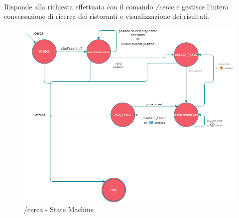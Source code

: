 \documentclass[a4paper, 12pt]{article}
\begin{document}
	\paragraph{}
	Risponde alla richiesta effettuata con il comando \textit{/cerca} e gestisce l'intera conversazione di ricerca dei ristoranti e visualizzazione dei risultati.\\
	\begin{figure}[h!]
	\centering
	\includegraphics[scale=0.7]{TasteIt_Cerca_StateMachine.png}
	\caption{/cerca - State Machine}
	\label{fig:CercaStateMachine}
	\end{figure}
	
	\newpage
\end{document}
